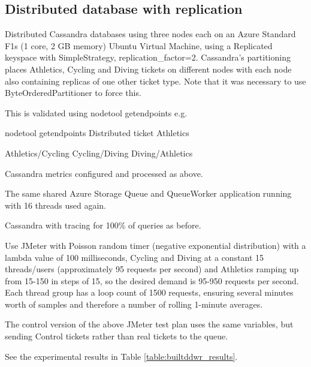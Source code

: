 %
%
\FloatBarrier
\subsection{Distributed database with replication}

\begin{shaded}
Distributed Cassandra databases using three nodes each on an Azure Standard F1s (1 core, 2 GB memory) Ubuntu Virtual Machine, using a Replicated keyspace with SimpleStrategy, replication\_factor=2.  Cassandra's partitioning places Athletics, Cycling and Diving tickets on different nodes with each node also containing replicas of one other ticket type.  Note that it was necessary to use ByteOrderedPartitioner to force this.

This is validated using nodetool getendpoints e.g.

nodetool getendpoints Distributed ticket Athletics

Athletics/Cycling
Cycling/Diving
Diving/Athletics

Cassandra metrics configured and processed as above.

The same shared Azure Storage Queue and QueueWorker application running with 16 threads used again.

Cassandra with tracing for 100\% of queries as before.

Use JMeter with Poisson random timer (negative exponential distribution) with a lambda value of 100 milliseconds, Cycling and Diving at a constant 15 threads/users (approximately 95 requests per second) and Athletics ramping up from 15-150 in steps of 15, so the desired demand is 95-950 requests per second.  Each thread group has a loop count of 1500 requests, ensuring several minutes worth of samples and therefore a number of rolling 1-minute averages.

The control version of the above JMeter test plan uses the same variables, but sending Control tickets rather than real tickets to the queue.

See the experimental results in Table \ref{table:builtddwr_results}.
\end{shaded}

